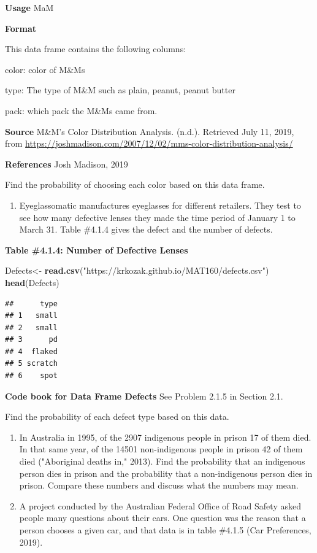 \documentclass[]{book}
\newenvironment{Shaded}{\begin{snugshade}}{\end{snugshade}}
\newcommand{\KeywordTok}[1]{\textcolor[rgb]{0.13,0.29,0.53}{\textbf{#1}}}
\newcommand{\NormalTok}[1]{#1}
\newcommand{\StringTok}[1]{\textcolor[rgb]{0.31,0.60,0.02}{#1}}
\providecommand{\tightlist}{%
  \setlength{\itemsep}{0pt}\setlength{\parskip}{0pt}}
\begin{document}
\textbf{Usage}
MaM

\textbf{Format}

This data frame contains the following columns:

color: color of M\&Ms

type: The type of M\&M such as plain, peanut, peanut butter

pack: which pack the M\&Ms came from.

\textbf{Source}
M\&M's Color Distribution Analysis. (n.d.). Retrieved July 11, 2019, from \url{https://joshmadison.com/2007/12/02/mms-color-distribution-analysis/}

\textbf{References}
Josh Madison, 2019

Find the probability of choosing each color based on this data frame.

\begin{enumerate}
\def\labelenumi{\arabic{enumi}.}
\setcounter{enumi}{1}
\tightlist
\item
  Eyeglassomatic manufactures eyeglasses for different retailers. They
  test to see how many defective lenses they made the time period of
  January 1 to March 31. Table \#4.1.4 gives the defect and the number
  of defects.
\end{enumerate}

\textbf{Table \#4.1.4: Number of Defective Lenses}

\begin{Shaded}
\begin{Highlighting}[]
\NormalTok{Defects<-}\StringTok{ }\KeywordTok{read.csv}\NormalTok{(}\StringTok{"https://krkozak.github.io/MAT160/defects.csv"}\NormalTok{) }
\KeywordTok{head}\NormalTok{(Defects)}
\end{Highlighting}
\end{Shaded}

\begin{verbatim}
##      type
## 1   small
## 2   small
## 3      pd
## 4  flaked
## 5 scratch
## 6    spot
\end{verbatim}

\textbf{Code book for Data Frame Defects} See Problem 2.1.5 in Section 2.1.

Find the probability of each defect type based on this data.

\begin{enumerate}
\def\labelenumi{\arabic{enumi}.}
\setcounter{enumi}{2}
\item
  In Australia in 1995, of the 2907 indigenous people in prison 17 of
  them died. In that same year, of the 14501 non-indigenous people in
  prison 42 of them died ("Aboriginal deaths in," 2013). Find the
  probability that an indigenous person dies in prison and the
  probability that a non-indigenous person dies in prison. Compare
  these numbers and discuss what the numbers may mean.
\item
  A project conducted by the Australian Federal Office of Road Safety
  asked people many questions about their cars. One question was the
  reason that a person chooses a given car, and that data is in table
  \#4.1.5 (Car Preferences, 2019).
\end{enumerate}
\end{document}
